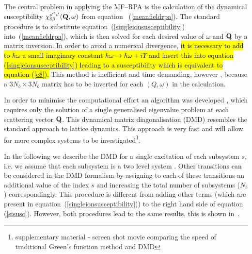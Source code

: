 The central problem in applying the MF--RPA is the calculation of the
dynamical susceptibility 
$\chi_{\delta\beta}^{s''s'}({\mathbf Q},\omega)$ 
from equation ~(\ref{meanfieldrpa}).
The standard procedure is to substitute equation~(\ref{singleionsusceptibility}) 
into~(\ref{meanfieldrpa}), which is 
then solved for each desired value of $\omega$ and ${\bf Q}$ by a matrix
inversion. In order to avoid a numerical divergence,
 \hl{it is necessary to add to $\hbar\omega$ a small imaginary
constant $\hbar\omega\to\hbar\omega +i\Upsilon$ and insert this into
equation (\ref{singleionsusceptibility}) leading to a susceptibility which is equivalent to 
equation (\ref{e8}). }
This method is inefficient and time demanding, however , because a $3N_b\times 3N_b$ matrix has to
be inverted for each $(Q,\omega)$ in the calculation.

In order to minimise the computational
effort an algorithm was developed \cite{rotter06-400}, which requires only the solution
of a single generalised eigenvalue problem at each scattering vector $\mathbf Q$.
This dynamical matrix diagonalisation (DMD) resembles the standard approach
to lattice dynamics. %
This approach is very fast and will allow for more complex 
systems to be investigated\footnote{supplementary material - screen
shot movie comparing the speed of traditional Green's function method and DMD}.

In the following we describe the DMD
 for a single excitation \hili{ $\epsilon_- \rightarrow \epsilon_+$ }
of each 
subsystem $s$, i.e.
we assume that each subsystem is a two level system
. 
Other transitions 
can be considered in the DMD formalism
 by assigning
to each of these transitions an additional value
 of the index $s$ and increasing the total number 
of subsystems ($N_b$) correspondingly. This
procedure is different from adding other terms 
(which are present in equation~(\ref{singleionsusceptibility}))
to the right hand side of equation (\ref{sisusc}). 
However, both procedures lead to the same results, 
this is shown in~\cite{rotter12-213201}.


